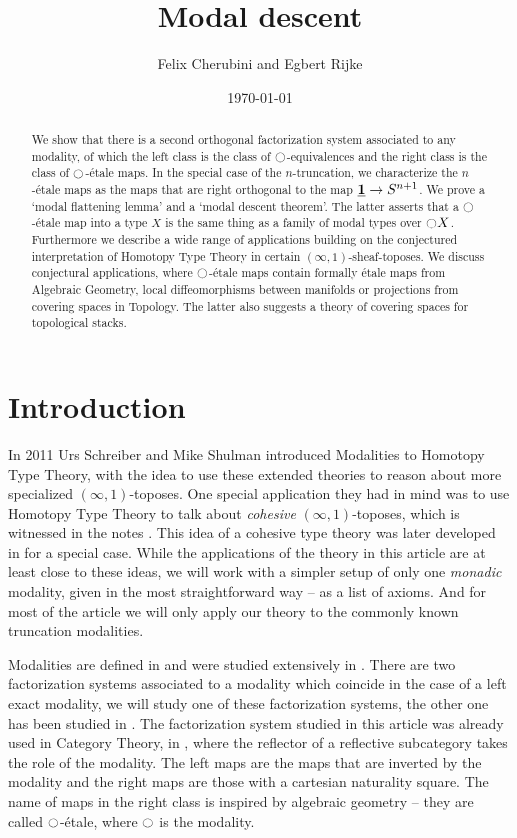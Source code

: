 \documentclass[9pt,twosided]{amsart}
\title{Modal descent}
\author{Felix Cherubini and Egbert Rijke}
\date{\today}
\begin{document}
\maketitle

\begin{abstract}
  We show that there is a second orthogonal factorization system associated to any modality, of which the left class is the class of ${\ocircle}$-equivalences and the right class is the class of ${\ocircle}$-\'etale maps. In the special case of the $n$-truncation, we characterize the $n$-\'etale maps as the maps that are right orthogonal to the map $\underline{\mathbf{1}} \to S^{n+1}$. We prove a `modal flattening lemma' and a `modal descent theorem'. The latter asserts that a ${\ocircle}$-\'etale map into a type $X$ is the same thing as a family of modal types over ${\ocircle} X$. Furthermore we describe a wide range of applications building on the conjectured interpretation of Homotopy Type Theory in certain $(\infty,1)$-sheaf-toposes. We discuss conjectural applications, where ${\ocircle}$-étale maps contain formally étale maps from Algebraic Geometry, local diffeomorphisms between manifolds or projections from covering spaces in Topology. The latter also suggests a theory of covering spaces for topological stacks.
\end{abstract}

\section{Introduction}
In 2011 Urs Schreiber and Mike Shulman introduced Modalities to Homotopy Type Theory,
with the idea to use these extended theories to reason about more specialized $(\infty,1)$-toposes.
One special application they had in mind was to use Homotopy Type Theory to talk about \emph{cohesive} $(\infty,1)$-toposes,
which is witnessed in the notes \cite{ShulmanSchreiber}.
This idea of a cohesive type theory was later developed in \cite{ShulmanRealCohesion} for a special case.
While the applications of the theory in this article are at least close to these ideas,
we will work with a simpler setup of only one \emph{monadic} modality, given in the most straightforward way -- as a list of axioms.
And for most of the article we will only apply our theory to the commonly known truncation modalities.
  
Modalities are defined in \cite[Section 7.7]{UFP} and were studied extensively in \cite{RijkeSpittersShulman}.
There are two factorization systems associated to a modality which coincide in the case of a left exact modality,
we will study one of these factorization systems, the other one has been studied in \cite{RijkeSpittersShulman}.
The factorization system studied in this article was already used in Category Theory, in \cite{cassidy_hebert_kelly_1985}, where the reflector of a reflective subcategory takes the role of the modality.
The left maps are the maps that are inverted by the modality and the right maps are those with a cartesian naturality square.
The name of maps in the right class is inspired by algebraic geometry -- they are called ${\ocircle}$-étale,
where ${\ocircle}$ is the modality.
\end{document}
